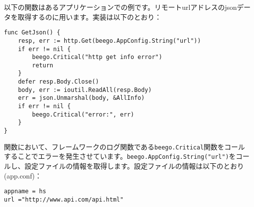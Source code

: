 以下の関数はあるアプリケーションでの例です。リモートurlアドレスのjsonデータを取得するのに用います。実装は以下のとおり：

\begin{lstlisting}[numbers=none]
func GetJson() {
    resp, err := http.Get(beego.AppConfig.String("url"))
    if err != nil {
        beego.Critical("http get info error")
        return
    }
    defer resp.Body.Close()
    body, err := ioutil.ReadAll(resp.Body)
    err = json.Unmarshal(body, &AllInfo)
    if err != nil {
        beego.Critical("error:", err)
    }
}
\end{lstlisting}

関数において、フレームワークのログ関数である\texttt{beego.Critical}関数をコールすることでエラーを発生させています。\texttt{beego.AppConfig.String("url")}をコールし、設定ファイルの情報を取得します。設定ファイルの情報は以下のとおり(app.conf)：

\begin{lstlisting}[numbers=none]
appname = hs
url ="http://www.api.com/api.html"
\end{lstlisting}


